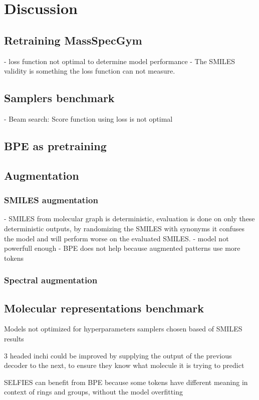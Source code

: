 \chapter{Discussion}
\label{chap:discussion}


\section{Retraining MassSpecGym}
- loss function not optimal to determine model performance
- The SMILES validity is something the loss function can not measure.

\section{Samplers benchmark}

- Beam search: Score function using loss is not optimal


\section{\ac{BPE} as pretraining}


\section{Augmentation}

\subsection{SMILES augmentation}
- SMILES from molecular graph is deterministic, evaluation is done on only these deterministic outputs, by randomizing the SMILES with synonyms it confuses the model and will perform worse on the evaluated SMILES.
- model not powerfull enough
- BPE does not help because augmented patterns use more tokens

\subsection{Spectral augmentation}


\section{Molecular representations benchmark}

Models not optimized for hyperparameters
samplers chosen based of SMILES results

3 headed inchi could be improved by supplying the output of the previous decoder to the next, to ensure they know what molecule it is trying to predict

SELFIES can benefit from BPE because some tokens have different meaning in context of rings and groups, without the model overfitting